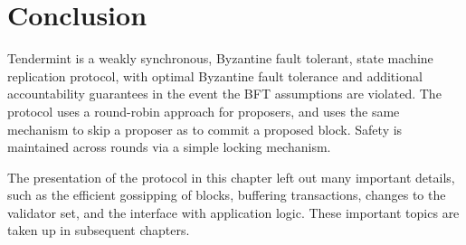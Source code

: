 \section{Conclusion}

Tendermint is a weakly synchronous, Byzantine fault tolerant, state machine replication protocol,
with optimal Byzantine fault tolerance and additional accountability guarantees in the event
the BFT assumptions are violated. 
The protocol uses a round-robin approach for proposers, and uses the same mechanism to skip a proposer as to commit a proposed block.
Safety is maintained across rounds via a simple locking mechanism.

The presentation of the protocol in this chapter left out many important details, 
such as the efficient gossipping of blocks, buffering transactions, changes to the validator set, 
and the interface with application logic. These important topics are taken up in subsequent chapters.



